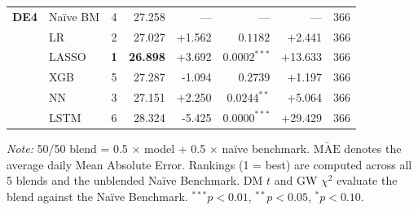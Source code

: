 \begin{table}[ht]
\begin{tabular}{llcrrrrr}
    \midrule
    \textbf{DE4} & Na\"ive BM & 4 & 27.258 & — & — & — & 366 \\
                 & LR       & 2 & 27.027 & +1.562 & $0.1182$ & +2.441 & 366 \\
                 & LASSO    & \textbf{1} & \textbf{26.898} & +3.692 & $0.0002^{***}$ & +13.633 & 366 \\
                 & XGB      & 5 & 27.287 & -1.094 & $0.2739$ & +1.197 & 366 \\
                 & NN       & 3 & 27.151 & +2.250 & $0.0244^{**}$ & +5.064 & 366 \\
                 & LSTM     & 6 & 28.324 & -5.425 & $0.0000^{***}$ & +29.429 & 366 \\
\bottomrule
\end{tabular}
\begin{tablenotes}\small
\item \textit{Note:} 50/50 blend = 0.5 $\times$ model + 0.5 $\times$ na\"ive benchmark. $\bar{\text{MAE}}$ denotes the average daily Mean Absolute Error.
Rankings (1 = best) are computed across all 5 blends and the unblended Na\"ive Benchmark.
DM $t$ and GW $\chi^2$ evaluate the blend against the Na\"ive Benchmark.
$^{***}p<0.01$, $^{**}p<0.05$, $^{*}p<0.10$.
\end{tablenotes}
\end{table}